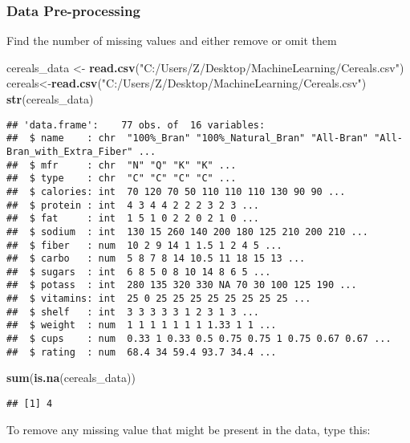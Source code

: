 \documentclass[
]{article}
\author{}
\date{\vspace{-2.5em}}
\newenvironment{Shaded}{\begin{snugshade}}{\end{snugshade}}
\newcommand{\KeywordTok}[1]{\textcolor[rgb]{0.13,0.29,0.53}{\textbf{#1}}}
\newcommand{\NormalTok}[1]{#1}
\newcommand{\StringTok}[1]{\textcolor[rgb]{0.31,0.60,0.02}{#1}}
\begin{document}
\hypertarget{data-pre-processing}{%
\subsubsection{Data Pre-processing}\label{data-pre-processing}}

Find the number of missing values and either remove or omit them

\begin{Shaded}
\begin{Highlighting}[]
\NormalTok{cereals_data <-}\StringTok{ }\KeywordTok{read.csv}\NormalTok{(}\StringTok{"C:/Users/Z/Desktop/MachineLearning/Cereals.csv"}\NormalTok{)}
\NormalTok{cereals<-}\KeywordTok{read.csv}\NormalTok{(}\StringTok{"C:/Users/Z/Desktop/MachineLearning/Cereals.csv"}\NormalTok{)}
\KeywordTok{str}\NormalTok{(cereals_data)}
\end{Highlighting}
\end{Shaded}

\begin{verbatim}
## 'data.frame':    77 obs. of  16 variables:
##  $ name    : chr  "100%_Bran" "100%_Natural_Bran" "All-Bran" "All-Bran_with_Extra_Fiber" ...
##  $ mfr     : chr  "N" "Q" "K" "K" ...
##  $ type    : chr  "C" "C" "C" "C" ...
##  $ calories: int  70 120 70 50 110 110 110 130 90 90 ...
##  $ protein : int  4 3 4 4 2 2 2 3 2 3 ...
##  $ fat     : int  1 5 1 0 2 2 0 2 1 0 ...
##  $ sodium  : int  130 15 260 140 200 180 125 210 200 210 ...
##  $ fiber   : num  10 2 9 14 1 1.5 1 2 4 5 ...
##  $ carbo   : num  5 8 7 8 14 10.5 11 18 15 13 ...
##  $ sugars  : int  6 8 5 0 8 10 14 8 6 5 ...
##  $ potass  : int  280 135 320 330 NA 70 30 100 125 190 ...
##  $ vitamins: int  25 0 25 25 25 25 25 25 25 25 ...
##  $ shelf   : int  3 3 3 3 3 1 2 3 1 3 ...
##  $ weight  : num  1 1 1 1 1 1 1 1.33 1 1 ...
##  $ cups    : num  0.33 1 0.33 0.5 0.75 0.75 1 0.75 0.67 0.67 ...
##  $ rating  : num  68.4 34 59.4 93.7 34.4 ...
\end{verbatim}

\begin{Shaded}
\begin{Highlighting}[]
\KeywordTok{sum}\NormalTok{(}\KeywordTok{is.na}\NormalTok{(cereals_data))}
\end{Highlighting}
\end{Shaded}

\begin{verbatim}
## [1] 4
\end{verbatim}

To remove any missing value that might be present in the data, type
this:
\end{document}
